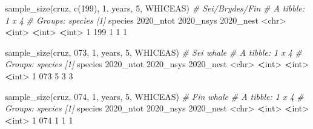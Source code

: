 \documentclass[
]{book}
\newenvironment{Shaded}{\begin{snugshade}}{\end{snugshade}}
\newcommand{\AttributeTok}[1]{\textcolor[rgb]{0.77,0.63,0.00}{#1}}
\newcommand{\CommentTok}[1]{\textcolor[rgb]{0.56,0.35,0.01}{\textit{#1}}}
\newcommand{\DecValTok}[1]{\textcolor[rgb]{0.00,0.00,0.81}{#1}}
\newcommand{\ErrorTok}[1]{\textcolor[rgb]{0.64,0.00,0.00}{\textbf{#1}}}
\newcommand{\FunctionTok}[1]{\textcolor[rgb]{0.00,0.00,0.00}{#1}}
\newcommand{\NormalTok}[1]{#1}
\newcommand{\SpecialCharTok}[1]{\textcolor[rgb]{0.00,0.00,0.00}{#1}}
\newcommand{\StringTok}[1]{\textcolor[rgb]{0.31,0.60,0.02}{#1}}
\begin{document}
\begin{Shaded}
\begin{Highlighting}[]
\FunctionTok{sample\_size}\NormalTok{(cruz, }\FunctionTok{c}\NormalTok{(}\StringTok{\textquotesingle{}199\textquotesingle{}}\NormalTok{), }
            \DecValTok{1}\NormalTok{, years, }\DecValTok{5}\NormalTok{, }\StringTok{\textquotesingle{}WHICEAS\textquotesingle{}}\NormalTok{) }\CommentTok{\# Sei/Bryde\textquotesingle{}s/Fin}
\CommentTok{\# A tibble: 1 x 4}
\CommentTok{\# Groups:   species [1]}
\NormalTok{  species }\StringTok{\textasciigrave{}}\AttributeTok{2020\_ntot}\StringTok{\textasciigrave{}} \StringTok{\textasciigrave{}}\AttributeTok{2020\_nsys}\StringTok{\textasciigrave{}} \StringTok{\textasciigrave{}}\AttributeTok{2020\_nest}\StringTok{\textasciigrave{}}
  \SpecialCharTok{\textless{}}\NormalTok{chr}\SpecialCharTok{\textgreater{}}         \ErrorTok{\textless{}}\NormalTok{int}\SpecialCharTok{\textgreater{}}       \ErrorTok{\textless{}}\NormalTok{int}\SpecialCharTok{\textgreater{}}       \ErrorTok{\textless{}}\NormalTok{int}\SpecialCharTok{\textgreater{}}
\DecValTok{1} \DecValTok{199}               \DecValTok{1}           \DecValTok{1}           \DecValTok{1}

\FunctionTok{sample\_size}\NormalTok{(cruz, }\StringTok{\textquotesingle{}073\textquotesingle{}}\NormalTok{, }\DecValTok{1}\NormalTok{, years, }\DecValTok{5}\NormalTok{, }\StringTok{\textquotesingle{}WHICEAS\textquotesingle{}}\NormalTok{) }\CommentTok{\# Sei whale}
\CommentTok{\# A tibble: 1 x 4}
\CommentTok{\# Groups:   species [1]}
\NormalTok{  species }\StringTok{\textasciigrave{}}\AttributeTok{2020\_ntot}\StringTok{\textasciigrave{}} \StringTok{\textasciigrave{}}\AttributeTok{2020\_nsys}\StringTok{\textasciigrave{}} \StringTok{\textasciigrave{}}\AttributeTok{2020\_nest}\StringTok{\textasciigrave{}}
  \SpecialCharTok{\textless{}}\NormalTok{chr}\SpecialCharTok{\textgreater{}}         \ErrorTok{\textless{}}\NormalTok{int}\SpecialCharTok{\textgreater{}}       \ErrorTok{\textless{}}\NormalTok{int}\SpecialCharTok{\textgreater{}}       \ErrorTok{\textless{}}\NormalTok{int}\SpecialCharTok{\textgreater{}}
\DecValTok{1} \DecValTok{073}               \DecValTok{5}           \DecValTok{3}           \DecValTok{3}

\FunctionTok{sample\_size}\NormalTok{(cruz, }\StringTok{\textquotesingle{}074\textquotesingle{}}\NormalTok{, }\DecValTok{1}\NormalTok{, years, }\DecValTok{5}\NormalTok{, }\StringTok{\textquotesingle{}WHICEAS\textquotesingle{}}\NormalTok{) }\CommentTok{\# Fin whale}
\CommentTok{\# A tibble: 1 x 4}
\CommentTok{\# Groups:   species [1]}
\NormalTok{  species }\StringTok{\textasciigrave{}}\AttributeTok{2020\_ntot}\StringTok{\textasciigrave{}} \StringTok{\textasciigrave{}}\AttributeTok{2020\_nsys}\StringTok{\textasciigrave{}} \StringTok{\textasciigrave{}}\AttributeTok{2020\_nest}\StringTok{\textasciigrave{}}
  \SpecialCharTok{\textless{}}\NormalTok{chr}\SpecialCharTok{\textgreater{}}         \ErrorTok{\textless{}}\NormalTok{int}\SpecialCharTok{\textgreater{}}       \ErrorTok{\textless{}}\NormalTok{int}\SpecialCharTok{\textgreater{}}       \ErrorTok{\textless{}}\NormalTok{int}\SpecialCharTok{\textgreater{}}
\DecValTok{1} \DecValTok{074}               \DecValTok{1}           \DecValTok{1}           \DecValTok{1}


\end{Highlighting}
\end{Shaded}
\end{document}
